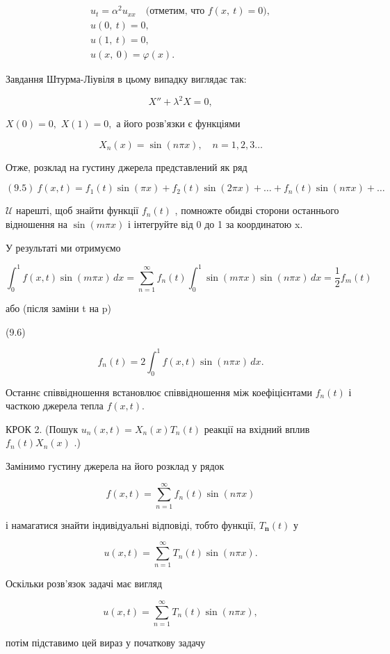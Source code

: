 \documentclass[
  ukrainian,
]{article}
\begin{document}
\[
\begin{array}{c} u_t = \alpha^2 u_{xx} \quad \text{(отметим, что } f(x, \ t) = 0), \\ u(0, \ t) = 0, \\ u(1, \ t) = 0, \\ u(x, \ 0) = \varphi(x). \end{array}
\]

Завдання Штурма-Ліувіля в цьому випадку виглядає так:

\[
X'' + \lambda^2 X = 0,
\]

\(X(0) = 0,\) \(X(1) = 0,\) а його розв'язки є функціями

\[
X_n(x) = \sin(n\pi x), \quad n = 1, 2, 3 \dots
\]

Отже, розклад на густину джерела представлений як ряд

\[
(9.5) \ f(x,t) = f_1(t) \sin(\pi x) + f_2(t) \sin(2\pi x) + \dots + f_n(t) \sin(n\pi x) + \dots
\]

\(\mathcal{U}\) нарешті, щоб знайти функції \(f_n(t)\) , помножте обидві
сторони останнього відношення на \(\sin(m\pi x)\) і інтегруйте від 0 до
1 за координатою x.

У результаті ми отримуємо

\[
\int_{0}^{1} f(x, t) \sin(m\pi x)\,dx = \sum_{n=1}^{\infty} f_{n}(t) \int_{0}^{1} \sin(m\pi x) \sin(n\pi x)\,dx = \frac{1}{2} f_{m}(t)
\]

або (після заміни t на p)

(9.6)

\[
f_{n}(t) = 2 \int_{0}^{1} f(x, t) \sin(n\pi x)\,dx.
\]

Останнє співвідношення встановлює співвідношення між коефіцієнтами
\(f_n(t)\) і часткою джерела тепла \(f(x, t)\).

КРОК 2. (Пошук \(u_n(x, t) = X_n(x) T_n(t)\) реакції на вхідний вплив
\(f_n(t) X_n(x)\) .)

Замінимо густину джерела на його розклад у рядок

\[
f(x, t) = \sum_{n=1}^{\infty} f_n(t) \sin(n\pi x)
\]

і намагатися знайти індивідуальні відповіді, тобто функції,
\(T_{\mathbf{n}}(t)\) у

\[
u(x, t) = \sum_{n=1}^{\infty} T_n(t) \sin(n\pi x).
\]

Оскільки розв'язок задачі має вигляд

\[
u(x, t) = \sum_{n=1}^{\infty} T_n(t) \sin(n\pi x),
\]

потім підставимо цей вираз у початкову задачу
\end{document}
